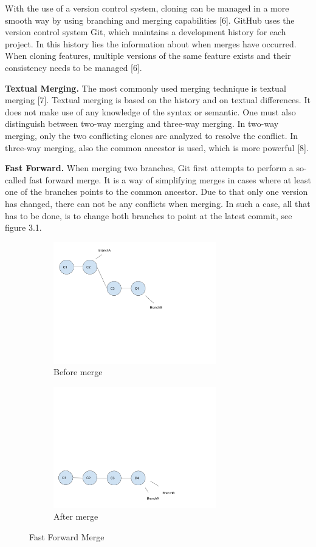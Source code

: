 With the use of a version control system, cloning can be managed in a more smooth way by using branching and merging capabilities [6]. GitHub uses the version control system Git, which maintains a development history for each project. In this history lies the information about when merges have occurred. When cloning features, multiple versions of the same feature exists and their consistency needs to be managed [6].

\textbf{Textual Merging.} The most commonly used merging technique is textual merging [7]. Textual merging is based on the history and on textual differences. It does not make use of any knowledge of the syntax or semantic. One must also distinguish between two-way merging and three-way merging. In two-way merging, only the two conflicting clones are analyzed to resolve the conflict. In three-way merging, also the common ancestor is used, which is more powerful [8].

\textbf{Fast Forward.} When merging two branches, Git first attempts to perform a so-called fast forward merge. It is a way of simplifying merges in cases where at least one of the branches points to the common ancestor. Due to that only one version has changed, there can not be any conflicts when merging. In such a case, all that has to be done, is to change both branches to point at the latest commit, see figure 3.1.
\begin{figure}[h]
   \centering
   \begin{subfigure}[b]{0.3\textwidth}
       \includegraphics[width=200pt]{figure/ff1.png}
       \caption{Before merge}
       \label{fig:branch1}
   \end{subfigure}
   \begin{subfigure}[b]{0.3\textwidth}
       \includegraphics[width=200pt]{figure/ff2.png}
       \caption{After merge}
       \label{fig:branch3}
   \end{subfigure}
   \caption{Fast Forward Merge}\label{fig:fastforward}
\end{figure}

